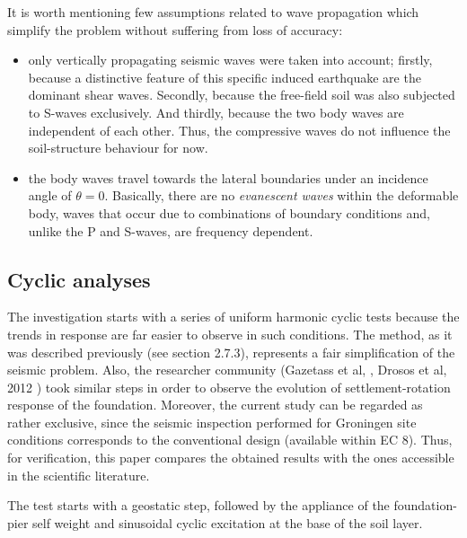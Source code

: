	It is worth mentioning few assumptions related to wave propagation which simplify the problem without suffering from loss of accuracy:
	\begin{itemize}
		\item only vertically propagating seismic waves were taken into account; firstly, because a distinctive feature of this specific induced earthquake are the dominant shear waves. Secondly, because the free-field soil was also subjected to S-waves exclusively. And thirdly, because the two body waves are independent of each other. Thus, the compressive waves do not influence the soil-structure behaviour for now.
		\item the body waves travel towards the lateral boundaries under an incidence angle of $\theta = 0$. Basically, there are no \textit{evanescent waves} within the deformable body, waves that occur due to combinations of boundary conditions and, unlike the P and S-waves, are frequency dependent.
	\end{itemize}
	
\subsection{Cyclic analyses}
	The investigation starts with a series of  uniform harmonic cyclic tests because the trends in response are far easier to observe in such conditions. The method, as it was described previously (see section 2.7.3), represents a fair simplification of the seismic \mbox{problem}. Also, the researcher community (Gazetass et al, \cite{gazetas2004seismic}, Drosos et al, 2012 \cite{drosos2012soil}) took similar steps in order to observe the evolution of settlement-rotation response of the foundation. Moreover, the current study can be regarded as rather exclusive, since the seismic inspection performed for Groningen site conditions corresponds to the conventional design (available within EC 8). Thus, for verification, this paper compares the obtained results with the ones accessible in the scientific literature.

	The test starts with a geostatic step, followed by the appliance of the foundation-pier self weight and sinusoidal cyclic excitation at the base of the soil layer. 
	
